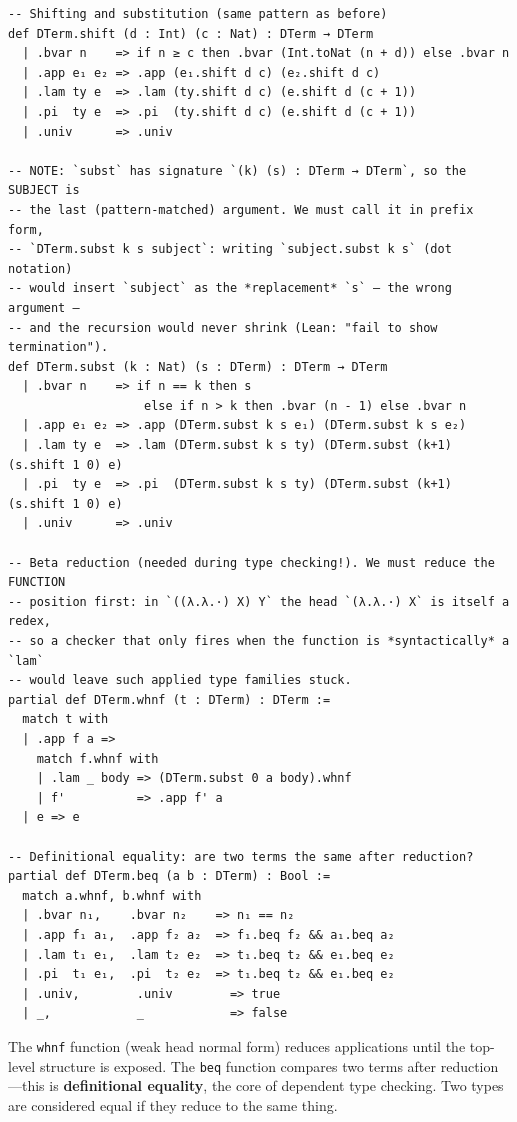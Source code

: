 \documentclass[11pt,a4paper]{article}
\theoremstyle{definition}
\begin{document}
\begin{verbatim}
-- Shifting and substitution (same pattern as before)
def DTerm.shift (d : Int) (c : Nat) : DTerm → DTerm
  | .bvar n    => if n ≥ c then .bvar (Int.toNat (n + d)) else .bvar n
  | .app e₁ e₂ => .app (e₁.shift d c) (e₂.shift d c)
  | .lam ty e  => .lam (ty.shift d c) (e.shift d (c + 1))
  | .pi  ty e  => .pi  (ty.shift d c) (e.shift d (c + 1))
  | .univ      => .univ

-- NOTE: `subst` has signature `(k) (s) : DTerm → DTerm`, so the SUBJECT is
-- the last (pattern-matched) argument. We must call it in prefix form,
-- `DTerm.subst k s subject`: writing `subject.subst k s` (dot notation)
-- would insert `subject` as the *replacement* `s` — the wrong argument —
-- and the recursion would never shrink (Lean: "fail to show termination").
def DTerm.subst (k : Nat) (s : DTerm) : DTerm → DTerm
  | .bvar n    => if n == k then s
                   else if n > k then .bvar (n - 1) else .bvar n
  | .app e₁ e₂ => .app (DTerm.subst k s e₁) (DTerm.subst k s e₂)
  | .lam ty e  => .lam (DTerm.subst k s ty) (DTerm.subst (k+1) (s.shift 1 0) e)
  | .pi  ty e  => .pi  (DTerm.subst k s ty) (DTerm.subst (k+1) (s.shift 1 0) e)
  | .univ      => .univ

-- Beta reduction (needed during type checking!). We must reduce the FUNCTION
-- position first: in `((λ.λ.·) X) Y` the head `(λ.λ.·) X` is itself a redex,
-- so a checker that only fires when the function is *syntactically* a `lam`
-- would leave such applied type families stuck.
partial def DTerm.whnf (t : DTerm) : DTerm :=
  match t with
  | .app f a =>
    match f.whnf with
    | .lam _ body => (DTerm.subst 0 a body).whnf
    | f'          => .app f' a
  | e => e

-- Definitional equality: are two terms the same after reduction?
partial def DTerm.beq (a b : DTerm) : Bool :=
  match a.whnf, b.whnf with
  | .bvar n₁,    .bvar n₂    => n₁ == n₂
  | .app f₁ a₁,  .app f₂ a₂  => f₁.beq f₂ && a₁.beq a₂
  | .lam t₁ e₁,  .lam t₂ e₂  => t₁.beq t₂ && e₁.beq e₂
  | .pi  t₁ e₁,  .pi  t₂ e₂  => t₁.beq t₂ && e₁.beq e₂
  | .univ,        .univ        => true
  | _,            _            => false
\end{verbatim}

The \texttt{whnf} function (weak head normal form) reduces applications until
the top-level structure is exposed. The \texttt{beq} function compares two
terms after reduction---this is \textbf{definitional equality}, the core of
dependent type checking. Two types are considered equal if they reduce to the
same thing.
\end{document}

